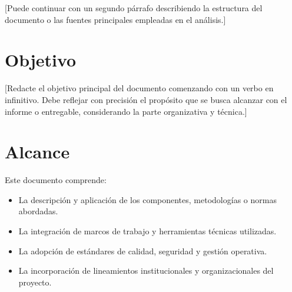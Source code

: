 \documentclass[10pt,letterpaper]{article}
\begin{document}
[Puede continuar con un segundo párrafo describiendo la estructura del documento o las fuentes principales empleadas en el análisis.]

\section{Objetivo}

[Redacte el objetivo principal del documento comenzando con un verbo en infinitivo. Debe reflejar con precisión el propósito que se busca alcanzar con el informe o entregable, considerando la parte organizativa y técnica.]

%

\section{Alcance}

Este documento comprende:
\begin{itemize}
    \item La descripción y aplicación de los componentes, metodologías o normas abordadas.
    \item La integración de marcos de trabajo y herramientas técnicas utilizadas.
    \item La adopción de estándares de calidad, seguridad y gestión operativa.
    \item La incorporación de lineamientos institucionales y organizacionales del proyecto.
\end{itemize}
\end{document}
